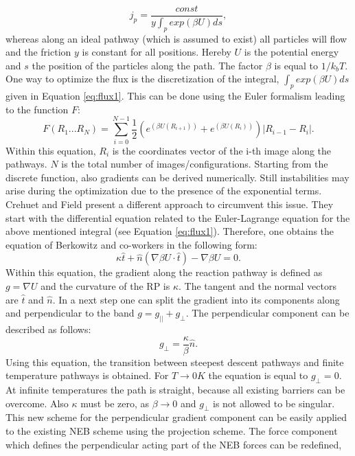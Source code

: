 \documentclass[10pt,a4paper]{article} %
\begin{document}
\begin{itemize}
	\begin{equation}
	j_{p} = \frac{const}{y\int_{p}exp(\beta U)ds},
	\label{eq:flux1}
	\end{equation}
	whereas along an ideal pathway (which is assumed to exist) all particles will flow and the friction $y$ is constant for all positions. Hereby $U$ is the potential energy and $s$ the position of the particles along the path. The factor $\beta$ is equal to $ 1/k_{b}T$. One way to optimize the flux is the discretization of the integral, $ \int_{p} exp(\beta U)ds$ given in Equation \ref{eq:flux1}. This can be done using the Euler formalism leading to the function $F$:
	\begin{equation}
	F(R_{1}...R_{N})=\sum^{N-1}_{i=0}\frac{1}{2}(e^{(\beta U (R_{i+1}))} + e^{(\beta U (R_{i}))})\left|R_{i-1}-R_{i}\right|.
	\end{equation}
	Within this equation, $ R_{i} $ is the coordinates vector of the i-th image along the pathways. $N$ is the total number of images/configurations. Starting from the discrete function, also gradients can be derived numerically. Still instabilities may arise during the optimization due to the presence of the exponential terms. Crehuet and Field\supercite{Crehuet2003} present a different approach to circumvent this issue. They start with the differential equation related to the Euler-Lagrange equation for the above mentioned integral (see Equation \ref{eq:flux1}). Therefore, one obtains the equation of Berkowitz and co-workers in the following form:		
	\begin{equation}
	\kappa \hat{t} + \hat{n} (\nabla \beta U \cdot \hat{t})-\nabla \beta U = 0.	
	\end{equation}
	Within this equation, the gradient along the reaction pathway is defined as $ g = \nabla U$ and the curvature of the RP is $\kappa$. The tangent and the normal vectors are $\hat{t}$ and $\hat{n}$. In a next step one can split the gradient into its components along and perpendicular to the band $ g = g_{||} + g_{\bot} $. The perpendicular component can be described as follows:	
	\begin{equation}
	g_{\bot}=\frac{\kappa}{\beta} \hat{n}.
	\end{equation}
	Using this equation, the transition between steepest descent pathways and finite temperature pathways is obtained. For $T\rightarrow 0K$ the equation is equal to $ g_{\bot}=0$. At infinite temperatures the path is straight, because all existing barriers can be overcome. Also $\kappa$ must be zero, as $ \beta \rightarrow 0$ and $g_{\bot}$ is not allowed to be singular. This new scheme for the perpendicular gradient component can be easily applied to the existing NEB scheme using the projection scheme. The force component which defines the perpendicular acting part of the NEB forces can be redefined,

\end{itemize}
\end{document}
